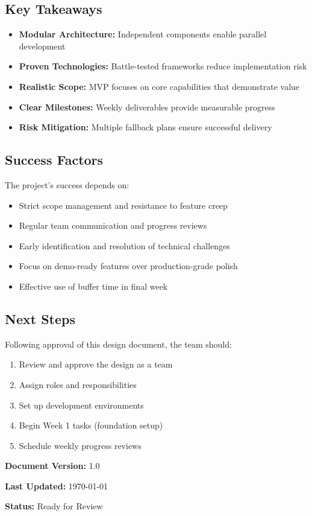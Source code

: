 \documentclass[12pt,a4paper]{article}
\begin{document}
\subsection{Key Takeaways}

\begin{itemize}[leftmargin=1cm,itemsep=0pt]
    \item \textbf{Modular Architecture:} Independent components enable parallel development
    \item \textbf{Proven Technologies:} Battle-tested frameworks reduce implementation risk
    \item \textbf{Realistic Scope:} MVP focuses on core capabilities that demonstrate value
    \item \textbf{Clear Milestones:} Weekly deliverables provide measurable progress
    \item \textbf{Risk Mitigation:} Multiple fallback plans ensure successful delivery
\end{itemize}

\subsection{Success Factors}

The project's success depends on:
\begin{itemize}[leftmargin=1cm,itemsep=0pt]
    \item Strict scope management and resistance to feature creep
    \item Regular team communication and progress reviews
    \item Early identification and resolution of technical challenges
    \item Focus on demo-ready features over production-grade polish
    \item Effective use of buffer time in final week
\end{itemize}

\subsection{Next Steps}

Following approval of this design document, the team should:
\begin{enumerate}[leftmargin=1cm,itemsep=0pt]
    \item Review and approve the design as a team
    \item Assign roles and responsibilities
    \item Set up development environments
    \item Begin Week 1 tasks (foundation setup)
    \item Schedule weekly progress reviews
\end{enumerate}

\vspace{1cm}

\textbf{Document Version:} 1.0

\textbf{Last Updated:} \today

\textbf{Status:} Ready for Review
\end{document}
